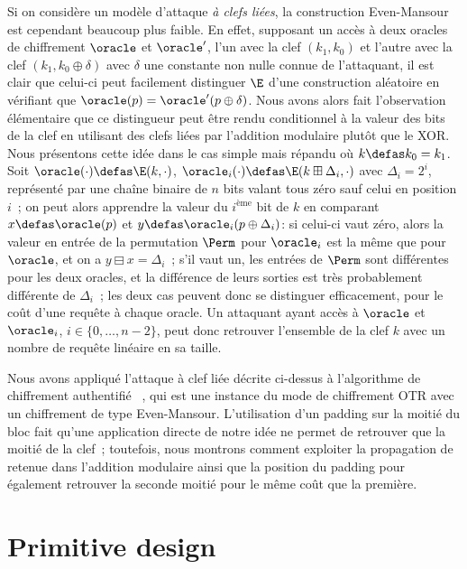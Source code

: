 Si on considère un modèle d'attaque \emph{à clefs liées}, la construction Even-Mansour est cependant beaucoup plus faible. En effet, supposant un accès à deux oracles de chiffrement
$\oracle$ et $\oracle'$, l'un avec la clef $(k_1,k_0)$ et l'autre avec la clef $(k_1,k_0\oplus\delta)$ avec $\delta$ une constante non nulle connue de l'attaquant,
il est clair que celui-ci peut facilement distinguer $\E$ d'une construction aléatoire en vérifiant que $\oracle(p) = \oracle'(p \oplus \delta)$.
Nous avons alors fait l'observation élémentaire que ce distingueur peut être rendu conditionnel à la valeur des bits de la clef en utilisant des clefs liées par l'addition
modulaire plutôt que le XOR. Nous présentons cette idée dans le cas simple mais répandu où $k \defas k_0 = k_1$. Soit $\oracle(\cdot) \defas \E(k, \cdot)$, $\oracle_i(\cdot)
\defas \E(k \boxplus \Delta_i,\cdot)$ avec $\Delta_i = 2^i$, représenté par une chaîne binaire de $n$ bits valant tous zéro sauf celui en position $i$~; on peut alors
apprendre la valeur du $i^\text{ème}$ bit de $k$ en comparant $x \defas \oracle(p)$ et $y \defas \oracle_i(p \oplus \Delta_i)$: si celui-ci vaut zéro, alors la valeur
en entrée de la permutation $\Perm$ pour $\oracle_i$ est la même que pour $\oracle$, et on a $y \boxminus x = \Delta_i$~; s'il vaut un, les entrées de $\Perm$ sont différentes
pour les deux oracles, et la différence de leurs sorties est très probablement différente de $\Delta_i$~; les deux cas peuvent donc se distinguer efficacement, pour le coût
d'une requête à chaque oracle. Un attaquant ayant accès à $\oracle$ et $\oracle_i$, $i \in \{0,\ldots,n - 2\}$, peut donc retrouver l'ensemble de la clef $k$
avec un nombre de requête linéaire en sa taille.

Nous avons appliqué l'attaque à clef liée décrite ci-dessus à l'algorithme de chiffrement authentifié \proestotr~\cite{proest}, qui est une instance du mode de chiffrement
OTR avec un chiffrement de type Even-Mansour.  L'utilisation d'un padding sur la moitié du bloc fait qu'une application directe de notre idée ne permet de retrouver que la moitié
de la clef~; toutefois, nous montrons comment exploiter la propagation de retenue dans l'addition modulaire ainsi que la position du padding pour également retrouver la seconde moitié pour le même coût que la première.

\section[Conception de primitives]{Primitive design}


